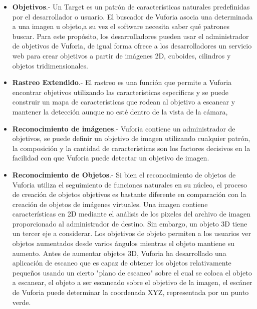 	
	\begin{itemize}
	
	\item \textbf{Objetivos}.- Un Target es un patrón de características naturales predefinidas por el desarrollador o usuario. El buscador de  Vuforia asocia una determinada a una imagen u objeto,a  su vez el software necesita saber qué patrones buscar. Para este propósito, los desarrolladores pueden usar el administrador de objetivos de Vuforia, de igual forma ofrece a los desarrolladores un servicio web para crear objetivos a partir de imágenes 2D, cuboides, cilindros y objetos tridimensionales.
	
	\item \textbf{Rastreo Extendido}.- El rastreo es una función que permite a Vuforia encontrar objetivos utilizando las características especificas y se  puede construir un mapa de características que rodean al objetivo a escanear y mantener la detección aunque no esté dentro de la vista de la cámara, 
	
	\item \textbf{Reconocimiento de imágenes}.- Vuforia contiene un administrador de objetivos, se puede definir un objetivo de imagen utilizando cualquier patrón, la composición y la cantidad de características son los factores decisivos en la facilidad con que Vuforia puede detectar un objetivo de imagen.
	
	\item \textbf{Reconocimiento de Objetos}.- Si bien el reconocimiento de objetos de Vuforia utiliza el seguimiento de funciones naturales en su núcleo, el proceso de creación de objetos objetivos es bastante diferente en comparación con la creación de objetos de imágenes virtuales. Una imagen contiene características en 2D mediante el análisis de los pixeles del archivo de imagen proporcionado al administrador de destino. Sin embargo, un objeto 3D tiene un tercer eje a considerar. Los objetivos de objeto permiten a los usuarios ver objetos aumentados desde varios ángulos mientras el objeto mantiene su aumento. Antes de aumentar objetos 3D, Vuforia ha desarrollado una aplicación de escaneo que es capaz de obtener los objetos relativamente pequeños usando un cierto "plano de escaneo" sobre el cual se coloca el objeto a escanear, el objeto a ser escaneado sobre el objetivo de la imagen, el escáner de Vuforia puede determinar la coordenada XYZ, representada por un punto verde.
	

\end{itemize}
